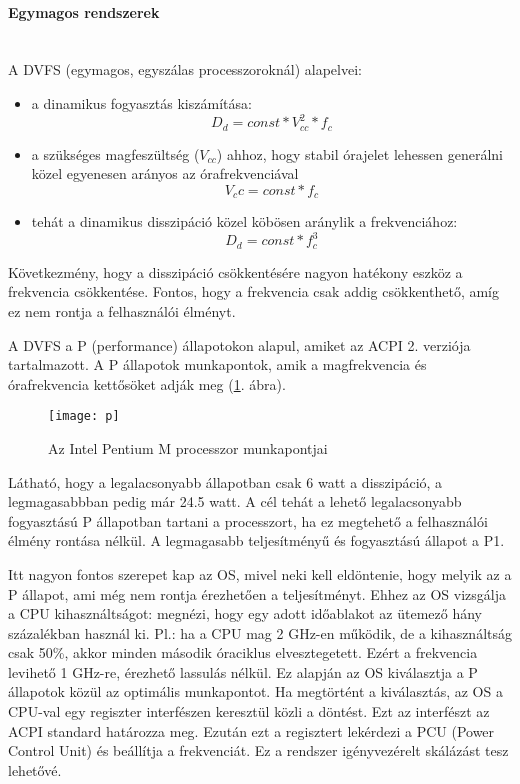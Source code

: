 \paragraph{Egymagos rendszerek}\mbox{}\\
A DVFS (egymagos, egyszálas processzoroknál) alapelvei:
\begin{itemize}
    \item a dinamikus fogyasztás kiszámítása:
        \begin{equation*}
            D_d = const * V_{cc}^2 * f_c
        \end{equation*}
    \item a szükséges magfeszültség ($V_{cc}$) ahhoz, hogy stabil órajelet lehessen generálni közel egyenesen arányos az órafrekvenciával
        \begin{equation*}
            V_cc = const * f_c
        \end{equation*}
    \item tehát a dinamikus disszipáció közel köbösen aránylik a frekvenciához:
        \begin{equation*}
            D_d = const * f_c^3
        \end{equation*}
\end{itemize}
Következmény, hogy a disszipáció csökkentésére nagyon hatékony eszköz a frekvencia csökkentése.
Fontos, hogy a frekvencia csak addig csökkenthető, amíg ez nem rontja a felhasználói élményt.

A DVFS a P (performance) állapotokon alapul, amiket az ACPI 2. verziója tartalmazott.
A P állapotok munkapontok, amik a magfrekvencia és órafrekvencia kettősöket adják meg (\ref{fig:p}. ábra).
\begin{figure}[H]
    \texttt{[image: p]}
    \centering
    \caption{Az Intel Pentium M processzor munkapontjai}
    \label{fig:p}
\end{figure}
Látható, hogy a legalacsonyabb állapotban csak 6 watt a disszipáció, a legmagasabbban pedig már 24.5 watt.
A cél tehát a lehető legalacsonyabb fogyasztású P állapotban tartani a processzort, ha ez megtehető a felhasználói élmény rontása nélkül.
A legmagasabb teljesítményű és fogyasztású állapot a P1.

Itt nagyon fontos szerepet kap az OS, mivel neki kell eldöntenie, hogy melyik az a P állapot, ami még nem rontja érezhetően a teljesítményt.
Ehhez az OS vizsgálja a CPU kihasználtságot: megnézi, hogy egy adott időablakot az ütemező hány százalékban használ ki.
Pl.: ha a CPU mag 2 GHz-en működik, de a kihasználtság csak 50\%, akkor minden második óraciklus elvesztegetett.
Ezért a frekvencia levihető 1 GHz-re, érezhető lassulás nélkül.
Ez alapján az OS kiválasztja a P állapotok közül az optimális munkapontot.
Ha megtörtént a kiválasztás, az OS a CPU-val egy regiszter interfészen keresztül közli a döntést.
Ezt az interfészt az ACPI standard határozza meg.
Ezután ezt a regisztert lekérdezi a PCU (Power Control Unit) és beállítja a frekvenciát.
Ez a rendszer igényvezérelt skálázást tesz lehetővé.

